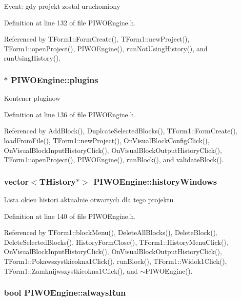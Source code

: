 Event: gdy projekt zostal uruchomiony 

Definition at line 132 of file PIWOEngine.h.

Referenced by TForm1::FormCreate(), TForm1::newProject(), TForm1::openProject(), PIWOEngine(), runNotUsingHistory(), and runUsingHistory().\hypertarget{classPIWOEngine_6433fe1909e1f8fdecd7ebc9cc0ec4a3}{
\subsubsection[plugins]{$\ast$ {\bf PIWOEngine::plugins}}}
\label{classPIWOEngine_6433fe1909e1f8fdecd7ebc9cc0ec4a3}


Kontener pluginow 

Definition at line 136 of file PIWOEngine.h.

Referenced by AddBlock(), DuplcateSelectedBlocks(), TForm1::FormCreate(), loadFromFile(), TForm1::newProject(), OnVisualBlockConfigClick(), OnVisualBlockInputHistoryClick(), OnVisualBlockOutputHistoryClick(), TForm1::openProject(), PIWOEngine(), runBlock(), and validateBlock().\hypertarget{classPIWOEngine_dd08ebde966bf33e79750fb1b1dcca08}{
\subsubsection[historyWindows]{\setlength{\rightskip}{0pt plus 5cm}vector$<${\bf THistory}$\ast$$>$ {\bf PIWOEngine::historyWindows}}}
\label{classPIWOEngine_dd08ebde966bf33e79750fb1b1dcca08}


Lista okien histori aktualnie otwartych dla tego projektu 

Definition at line 140 of file PIWOEngine.h.

Referenced by TForm1::blockMenu(), DeleteAllBlocks(), DeleteBlock(), DeleteSelectedBlocks(), HistoryFormClose(), TForm1::HistoryMenuClick(), OnVisualBlockInputHistoryClick(), OnVisualBlockOutputHistoryClick(), TForm1::Pokawszystkieokna1Click(), runBlock(), TForm1::Widok1Click(), TForm1::Zamknijwszystkieokna1Click(), and $\sim$PIWOEngine().\hypertarget{classPIWOEngine_5730b8e65319ad792660fa205495f298}{
\subsubsection[alwaysRun]{\setlength{\rightskip}{0pt plus 5cm}bool {\bf PIWOEngine::alwaysRun}}}
\label{classPIWOEngine_5730b8e65319ad792660fa205495f298}


